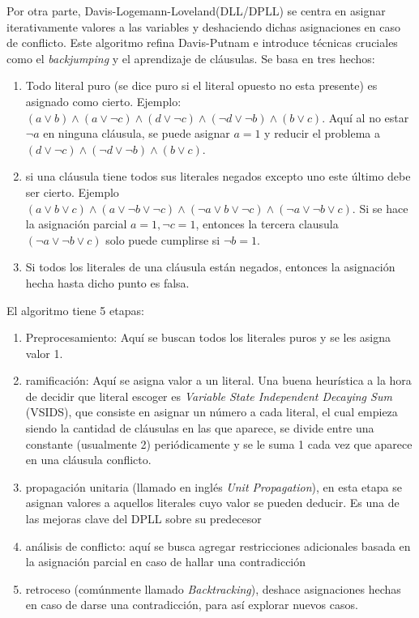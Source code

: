 \documentclass[runningheads]{llncs}
\begin{document}
Por otra parte, Davis-Logemann-Loveland(DLL/DPLL) se centra en asignar iterativamente valores a las variables y deshaciendo dichas asignaciones en caso de conflicto. Este algoritmo refina Davis-Putnam e introduce técnicas cruciales como el \textit{backjumping} y el aprendizaje de cláusulas. Se basa en tres hechos: 
\begin{enumerate}
    \item Todo literal puro (se dice puro si el literal opuesto no esta presente) es asignado como cierto. Ejemplo: $(a\lor  b) \land (a\lor  \neg c) \land (d\lor  \neg c) \land (\neg d\lor  \neg b) \land (b\lor  c) $. Aquí al no estar $\neg a$ en ninguna cláusula, se puede asignar $a=1$ y reducir el problema a $(d\lor  \neg c) \land (\neg d\lor  \neg b) \land (b\lor  c) $.
    \item si una cláusula tiene todos sus literales negados excepto uno este último debe ser cierto. Ejemplo $(a \lor  b \lor  c)\land(a\lor \neg b\lor \neg c)\land(\neg a\lor  b\lor \neg c) \land(\neg a\lor  \neg b\lor  c).$ Si se hace la asignación parcial $a=1, \neg c=1$, entonces la tercera clausula $(\neg a\lor  \neg b\lor  c)$ solo puede cumplirse si $\neg b=1$.
    \item Si todos los literales de una cláusula están negados, entonces la asignación hecha hasta dicho punto es falsa.\\
\end{enumerate}


El algoritmo tiene 5 etapas:
\begin{enumerate}
    \item Preprocesamiento: Aquí se buscan todos los literales puros y se les asigna valor 1.
    \item ramificación: Aquí se asigna valor a un literal. Una buena heurística a la hora de decidir que literal escoger es \textit{Variable State Independent Decaying Sum} (VSIDS), que consiste en asignar un número a cada literal, el cual empieza siendo la cantidad de cláusulas en las que aparece, se divide entre una constante (usualmente 2) periódicamente y se le suma 1 cada vez que aparece en una cláusula conflicto.
    \item propagación unitaria (llamado en inglés \textit{Unit Propagation}), en esta etapa se asignan valores a aquellos literales cuyo valor se pueden deducir. Es una de las mejoras clave del DPLL sobre su predecesor
    \item análisis de conflicto: aquí se busca agregar restricciones adicionales basada en la asignación parcial en caso de hallar una contradicción
    \item retroceso (comúnmente llamado \textit{Backtracking}), deshace asignaciones hechas en caso de darse una contradicción, para así explorar nuevos casos.\\
\end{enumerate}
\end{document}
